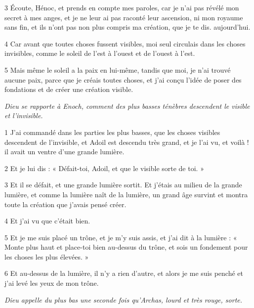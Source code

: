 \par 3 Écoute, Hénoc, et prends en compte mes paroles, car je n'ai pas révélé mon secret à mes anges, et je ne leur ai pas raconté leur ascension, ni mon royaume sans fin, et ils n'ont pas non plus compris ma création, que je te dis. aujourd'hui.

\par 4 Car avant que toutes choses fussent visibles, moi seul circulais dans les choses invisibles, comme le soleil de l'est à l'ouest et de l'ouest à l'est.

\par 5 Mais même le soleil a la paix en lui-même, tandis que moi, je n'ai trouvé aucune paix, parce que je créais toutes choses, et j'ai conçu l'idée de poser des fondations et de créer une création visible.


\par \textit{Dieu se rapporte à Enoch, comment des plus basses ténèbres descendent le visible et l'invisible.}

\par 1 J'ai commandé dans les parties les plus basses, que les choses visibles descendent de l'invisible, et Adoil est descendu très grand, et je l'ai vu, et voilà ! il avait un ventre d'une grande lumière.

\par 2 Et je lui dis : « Défait-toi, Adoil, et que le visible sorte de toi. »

\par 3 Et il se défait, et une grande lumière sortit. Et j'étais au milieu de la grande lumière, et comme la lumière naît de la lumière, un grand âge survint et montra toute la création que j'avais pensé créer.

\par 4 Et j'ai vu que c'était bien.

\par 5 Et je me suis placé un trône, et je m'y suis assis, et j'ai dit à la lumière : « Monte plus haut et place-toi bien au-dessus du trône, et sois un fondement pour les choses les plus élevées. »

\par 6 Et au-dessus de la lumière, il n'y a rien d'autre, et alors je me suis penché et j'ai levé les yeux de mon trône.


\par \textit{Dieu appelle du plus bas une seconde fois qu'Archas, lourd et très rouge, sorte.}

